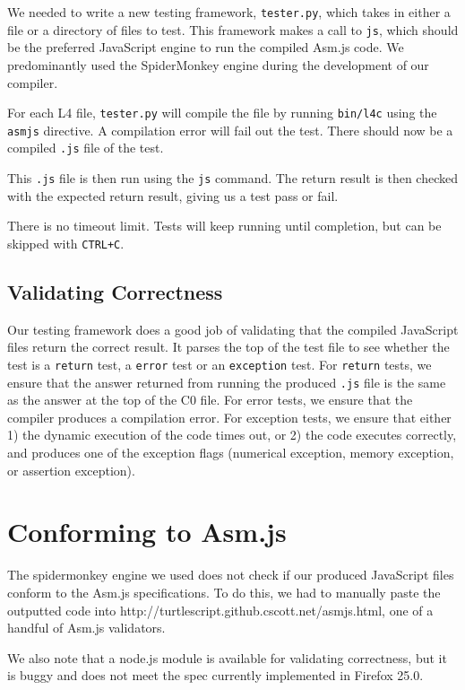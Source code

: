 \documentclass[twoside]{article}
\begin{document}
\begin{multicols}{2}
We needed to write a new testing framework, \texttt{tester.py}, which takes in either a
file or a directory of files to test. This framework makes a call to \texttt{js},
which should be the preferred JavaScript engine to run the compiled Asm.js code.
We predominantly used the SpiderMonkey engine during the development of our
compiler.

For each L4 file, \texttt{tester.py} will compile the file by running \texttt{bin/l4c} 
using the \texttt{asmjs} directive. A compilation error will fail out the test. There 
should now be a compiled \texttt{.js} file of the test.

This \texttt{.js} file is then run using the \texttt{js} command. The return
result is then checked with the expected return result, giving us a test pass
or fail.

There is no timeout limit. Tests will keep running until completion, but can be
skipped with \texttt{CTRL+C}.

\subsection{Validating Correctness}

Our testing framework does a good job of validating that the compiled JavaScript
files return the correct result. It parses the top of the test file to see whether
the test is a \texttt{return} test, a \texttt{error} test or an \texttt{exception} 
test. For \texttt{return} tests, we ensure that the answer returned from running 
the produced \texttt{.js} file is the same as the answer at the top of the C0 file.
For error tests, we ensure that the compiler produces a compilation error. For 
exception tests, we ensure that either 1) the dynamic execution of the code times
out, or 2) the code executes correctly, and produces one of the exception flags
(numerical exception, memory exception, or assertion exception). 


\section{Conforming to Asm.js}
The spidermonkey engine we used does not check if our produced JavaScript files
conform to the Asm.js specifications. To do this, we had to manually paste the
outputted code into http://turtlescript.github.cscott.net/asmjs.html, one of a 
handful of Asm.js validators. 

We also note that a node.js module is available for validating correctness, 
but it is buggy and does not meet the spec currently implemented in Firefox 25.0.


\end{multicols}
\end{document}
